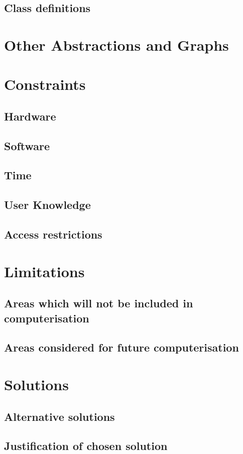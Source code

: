 \documentclass[12pt]{report}
\begin{document}
\subsection{Class definitions}

\section{Other Abstractions and Graphs}

\section{Constraints}

\subsection{Hardware}

\subsection{Software}

\subsection{Time}

\subsection{User Knowledge}

\subsection{Access restrictions}

\section{Limitations}

\subsection{Areas which will not be included in computerisation}

\subsection{Areas considered for future computerisation}

\section{Solutions}

\subsection{Alternative solutions}

\subsection{Justification of chosen solution}
\end{document}
